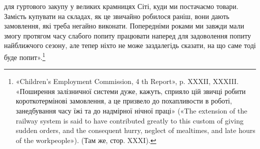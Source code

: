 для гуртового закупу у великих крамницях Сіті, куди ми постачаємо товари. Замість купувати на
складах, як це звичайно робилося раніш, вони дають замовлення, які треба негайно виконати.
Попередніми роками ми завжди мали змогу протягом часу
слабого попиту працювати наперед для задоволення попиту найближчого сезону, але тепер ніхто не може
заздалегідь сказати,
на що саме тоді буде попит».\footnote{
«Children’s Employment Commission, 4 th Report», p. XXXII,
XXXIII. «Поширення залізничної системи дуже, кажуть, сприяло цій
звичці робити короткотермінові замовлення, а це призвело до похапливости в роботі, занедбування часу
їжі та до надмірної нічної праці»
(«The extension of the railway system is said to have contributed greatly
to this custom of giving sudden orders, and the consequent hurry, neglect
of mealtimes, and late hours of the workpeople»). (Там же, стор. XXXI).
}
